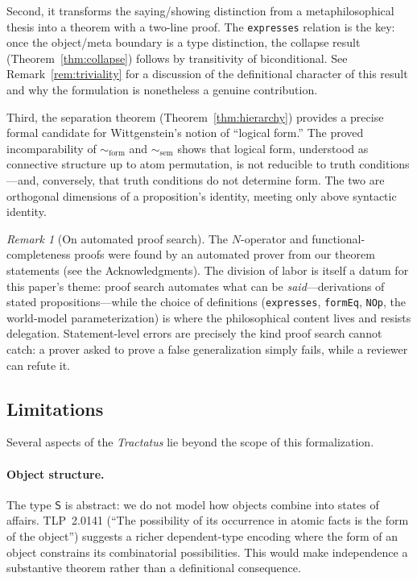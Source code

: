 \documentclass[jsl,bibother]{asl}
\theoremstyle{definition}
\theoremstyle{remark}
\newtheorem{remark}[theorem]{Remark}
\newcommand{\Sach}{\mathsf{S}}
\newcommand{\formEq}{\sim_{\mathrm{form}}}
\newcommand{\semEq}{\sim_{\mathrm{sem}}}
\begin{document}
Second, it transforms the saying/showing distinction from a
metaphilosophical thesis into a theorem with a two-line proof.
The \texttt{expresses} relation is the key: once the
object/meta boundary is a type distinction, the collapse result
(Theorem~\ref{thm:collapse}) follows by transitivity of
biconditional.  See Remark~\ref{rem:triviality} for a
discussion of the definitional character of this result and
why the formulation is nonetheless a genuine contribution.

Third, the separation theorem (Theorem~\ref{thm:hierarchy})
provides a precise formal candidate for Wittgenstein's
notion of ``logical form.''  The proved incomparability of
$\formEq$ and $\semEq$ shows that logical form, understood as
connective structure up to atom permutation, is not reducible to
truth conditions---and, conversely, that truth conditions do not
determine form.  The two are orthogonal dimensions of a
proposition's identity, meeting only above syntactic identity.

\begin{remark}[On automated proof search]
\label{rem:automation}
The $N$-operator and functional-completeness proofs were found
by an automated prover from our theorem statements (see the
Acknowledgments).  The division of labor is itself a datum for
this paper's theme: proof search automates what can be
\emph{said}---derivations of stated propositions---while the
choice of definitions (\texttt{expresses}, \texttt{formEq},
\texttt{NOp}, the world-model parameterization) is where the
philosophical content lives and resists delegation.
Statement-level errors are precisely the kind proof search
cannot catch: a prover asked to prove a false generalization
simply fails, while a reviewer can refute it.
\end{remark}

\subsection{Limitations}
\label{sec:limitations}

Several aspects of the \emph{Tractatus} lie beyond the scope of
this formalization.

\paragraph{Object structure.}
The type $\Sach$ is abstract: we do not model how objects combine
into states of affairs.  TLP~2.0141 (``The possibility of its
occurrence in atomic facts is the form of the object'') suggests
a richer dependent-type encoding where the form of an object
constrains its combinatorial possibilities.  This would make
independence a substantive theorem rather than a definitional
consequence.
\end{document}
